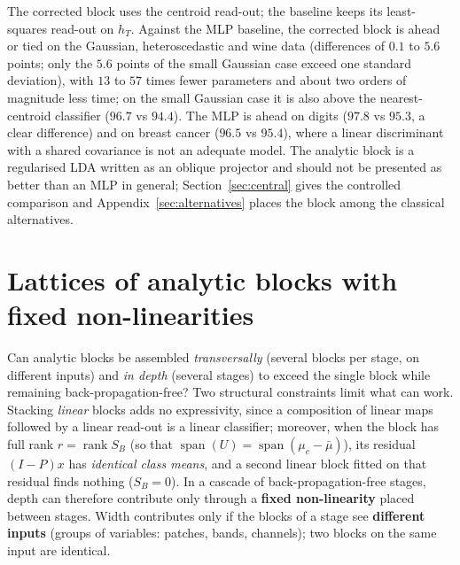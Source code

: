 \documentclass[11pt,a4paper]{article}
\theoremstyle{plain}
\theoremstyle{definition}
\theoremstyle{remark}
\newcommand{\rank}{\operatorname{rank}}
\newcommand{\spn}{\operatorname{span}}
\begin{document}
The corrected block uses the centroid read-out; the baseline keeps its
least-squares read-out on $h_T$. Against the MLP baseline, the corrected
block is ahead or tied on the Gaussian, heteroscedastic and wine data
(differences of $0.1$ to $5.6$ points; only the $5.6$ points of the small
Gaussian case exceed one standard deviation), with $13$ to $57$ times
fewer parameters and about two orders of magnitude less time; on the small
Gaussian case it is also above the nearest-centroid classifier ($96.7$ vs
$94.4$). The MLP is ahead on digits ($97.8$ vs $95.3$, a clear difference)
and on breast cancer ($96.5$ vs $95.4$), where a linear discriminant with a
shared covariance is not an adequate model. The analytic
block is a regularised LDA written as an oblique projector and should not
be presented as better than an MLP in general; Section~\ref{sec:central}
gives the controlled comparison and Appendix~\ref{sec:alternatives} places
the block among the classical alternatives.

\section{Lattices of analytic blocks with fixed non-linearities}
\label{sec:lattice}
Can analytic blocks be assembled \emph{transversally} (several blocks per
stage, on different inputs) and \emph{in depth} (several stages) to exceed
the single block while remaining back-propagation-free? Two structural
constraints limit what can work. Stacking \emph{linear} blocks adds no
expressivity, since a composition of linear maps followed by a linear
read-out is a linear classifier; moreover, when the block has full rank $r=\rank S_B$ (so that
$\spn(U)=\spn(\mu_c-\bar\mu)$), its residual $(I-P)x$ has \emph{identical
class means}, and a second linear block fitted on that residual finds
nothing ($S_B=0$). In a cascade of back-propagation-free stages, depth can therefore
contribute only through a \textbf{fixed non-linearity} placed between
stages. Width contributes only if the blocks of
a stage see \textbf{different inputs} (groups of variables: patches, bands,
channels); two blocks on the same input are identical.
\end{document}
